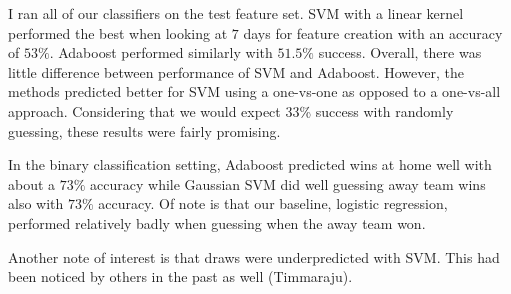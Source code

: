 \documentclass[paper=a4, fontsize=11pt]{scrartcl}
\numberwithin{equation}{section}		%
\numberwithin{figure}{section}			%
\numberwithin{table}{section}				%
\begin{document}
I ran all of our classifiers on the test feature set. SVM with a linear kernel performed the best when looking at $7$ days for feature creation with an accuracy of $53\%$. Adaboost performed similarly with $51.5\%$ success. Overall, there was little difference between performance of SVM and Adaboost. However, the methods predicted better for SVM using a one-vs-one as opposed to a one-vs-all approach. Considering that we would expect 33\% success with randomly guessing, these results were fairly promising.

In the binary classification setting, Adaboost predicted wins at home well with about a $73\%$ accuracy while Gaussian SVM did well guessing away team wins also with $73\%$ accuracy. Of note is that our baseline, logistic regression, performed relatively badly when guessing when the away team won.

Another note of interest is that draws were underpredicted with SVM. This had been noticed by others in the past as well (Timmaraju).


\end{document}
